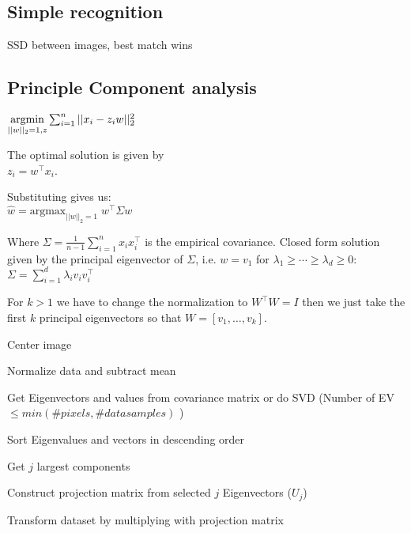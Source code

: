 \subsection*{Simple recognition}
SSD between images, best match wins 
\subsection*{Principle Component analysis }



$\underset{||w||_2 = 1, z}{\text{argmin}} \sum_{i=1}^n ||x_i - z_i w||_2^2$

The optimal solution is given by \\
$z_i = w^\top x_i$.  

Substituting gives us:\\
\qquad \qquad $\hat{w} = \text{argmax}_{||w||_2=1} \; w^\top \Sigma w$

Where $\Sigma = \frac{1}{n-1} \sum_{i=1}^n x_i x_i^\top$ is the empirical covariance. Closed form solution given by the principal eigenvector of $\Sigma$, i.e. $w = v_1$ for $\lambda_1 \geq \cdots \geq \lambda_d \geq 0$:
$\Sigma = \sum_{i=1}^d \lambda_i v_i v_i^\top$

For $k > 1$ we have to change the normalization to $W^\top W = I$ then we just take the first $k$ principal eigenvectors so that $W = [v_1, \ldots, v_k]$.


\begin{compactitem}
    \item Center image
    \item Normalize data and subtract mean 
    \item Get Eigenvectors and values from covariance matrix or do SVD (Number of EV $\leq min(\# pixels, \# datasamples)$  )
    \item Sort Eigenvalues and vectors in descending order
    \item Get $j$ largest components
    \item Construct projection matrix from selected $j$ Eigenvectors ($U_j$)
    \item Transform dataset by multiplying with projection matrix
\end{compactitem}

